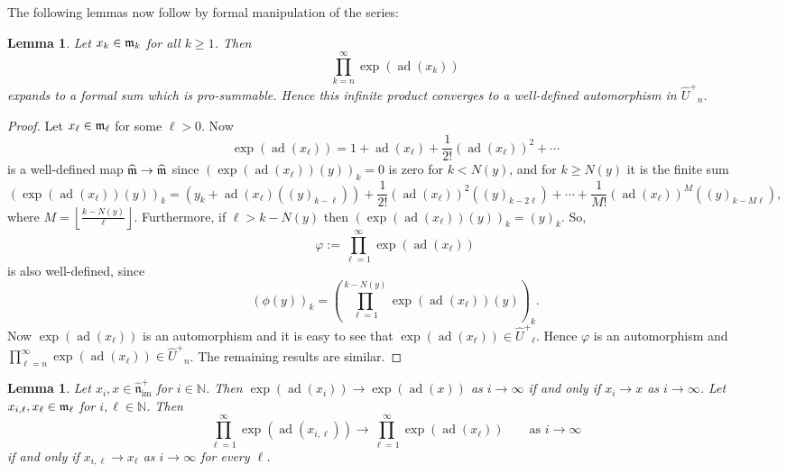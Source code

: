 \documentclass[11pt,letterpaper]{amsart}
\newcounter{thecounter}
\numberwithin{thecounter}{section}
\newtheorem{lemma}[thecounter]{Lemma}
\theoremstyle{definition}
\DeclareMathOperator{\ad}{ad}
\DeclareMathOperator{\im}{{im}}
\newcommand{\N}{{\mathbb N}}
\newcommand{\Uhp}{{\widehat{U}^+}}
\newcommand{\nhimp}{{\widehat{\mathfrak{n}}_{\im}^+}}
\begin{document}
\begin{shortver}
The following lemmas now follow by formal manipulation of the  series:
\end{shortver}

\begin{lemma}\label{L-welldef}
Let $x_k\in \frak m_k$  for all $k\geq1$. Then
$$\prod_{k=n}^\infty \exp\left(\ad\left(x_k \right) \right)$$
expands to a formal sum which is pro-summable. Hence this infinite product converges to
 a well-defined automorphism in $\Uhp_n$.
\end{lemma}

\begin{longver}
\begin{proof}
Let $x_\ell \in \frak m_\ell$ for some $\ell>0$. Now
 $$\exp\left(\ad\left(x_\ell \right) \right) =1+\ad\left(x_\ell \right)+\frac{1}{2!}\left(\ad\left(x_\ell \right) \right)^2+\cdots$$ 
is a well-defined  map $\widehat{\frak m}\to \widehat{\frak m}$ since
$\left(\exp\left(\ad\left(x_\ell \right) \right) \left(y \right) \right)_k=0$ is zero for $k<N(y)$, and for $k\ge N(y)$ it is the finite sum
$$ \left(\exp\left(\ad\left(x_\ell \right) \right) \left(y \right) \right)_k=\left(y_k +\ad\left(x_\ell \right)\left(\left(y \right)_{k-\ell} \right)\right)+\frac{1}{2!}\left(\ad\left(x_\ell \right) \right)^2\left(\left(y \right)_{k-2\ell} \right)+\cdots +\frac{1}{M!}\left(\ad\left(x_\ell \right) \right)^M\left(\left(y \right)_{k-M\ell} \right),$$
where  $M=\left\lfloor \frac{k-N(y)}{\ell} \right\rfloor$.
Furthermore, if $\ell> k-N(y)$ then  $\left(\exp\left(\ad\left(x_\ell \right) \right) \left(y \right)\right)_k=(y)_k$. So,
$$\varphi:=\prod_{\ell=1}^\infty \exp\left(\ad\left(x_\ell \right) \right)$$
is also well-defined, since 
$$\left(\phi \left(y \right) \right)_k = \left(\prod_{\ell=1}^{k-N(y)} \exp\left(\ad\left(x_\ell \right) \right)\left(y \right)\right)_k.$$
Now $\exp\left(\ad\left(x_\ell \right) \right)$ is an automorphism and it is easy to see that 
$\exp\left(\ad\left(x_\ell \right) \right)\in\Uhp_\ell$. 
Hence $\varphi$ is an automorphism and $\prod_{\ell=n}^\infty \exp\left(\ad\left(x_\ell \right) \right)\in \Uhp_n$.
The remaining results are similar.
\end{proof}
\end{longver}


\begin{lemma}\label{L-explim}
Let $x_{i}, x \in \nhimp$ for $i\in\N$. Then $\exp\left(\ad\left(x_i\right) \right)\to \exp(\ad(x))$ as $i\to\infty$ if and only if $x_i\to x$ as $i\to\infty$.
Let $x_{i,\ell}, x_\ell \in \frak m_\ell$  for $i,\ell\in\N$. Then
$$\prod_{\ell=1}^\infty \exp\left(\ad\left(x_{i,\ell} \right) \right)\to \prod_{\ell=1}^\infty \exp\left(\ad\left(x_\ell \right) \right) \qquad\text{as $i\to\infty$}$$
if and only if $x_{i,\ell}\to x_\ell$ as $i\to\infty$ for every $\ell$.
\end{lemma}
\end{document}
